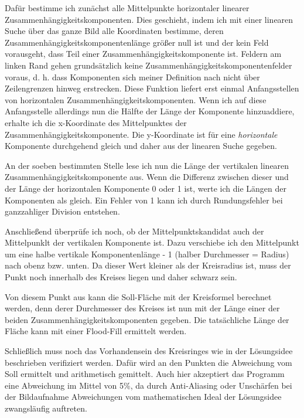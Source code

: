 Dafür bestimme ich zunächst alle Mittelpunkte horizontaler linearer Zusammenhängigkeitskomponenten. Dies geschieht, indem ich mit einer linearen Suche über das ganze Bild alle Koordinaten bestimme, deren Zusammenhängigkeitskomponentenlänge größer null ist und der kein Feld vorausgeht, dass Teil einer Zusammenhängigkeitskomponente ist. Feldern am linken Rand gehen grundsätzlich keine Zusammenhängigkeitskomponentenfelder voraus, d. h. dass Komponenten sich meiner Definition nach nicht über Zeilengrenzen hinweg erstrecken. Diese Funktion liefert erst einmal Anfangsstellen von horizontalen Zusammenhängigkeitskomponenten. Wenn ich auf diese Anfangsstelle allerdings nun die Hälfte der Länge der Komponente hinzuaddiere, erhalte ich die x-Koordinate des Mittelpunktes der Zusammenhängigkeitskomponente. Die y-Koordinate ist für eine \textit{horizontale} Komponente durchgehend gleich und daher aus der linearen Suche gegeben.

An der soeben bestimmten Stelle lese ich nun die Länge der vertikalen linearen Zusammenhängigkeitskomponente aus. Wenn die Differenz zwischen dieser und der Länge der horizontalen Komponente 0 oder 1 ist, werte ich die Längen der Komponenten als gleich. Ein Fehler von 1 kann ich durch Rundungsfehler bei ganzzahliger Division entstehen.

Anschließend überprüfe ich noch, ob der Mittelpunktskandidat auch der Mittelpunklt der vertikalen Komponente ist. Dazu verschiebe ich den Mittelpunkt um eine halbe vertikale Komponentenlänge - 1 (halber Durchmesser = Radius) nach obenz bzw. unten. Da dieser Wert kleiner als der Kreisradius ist, muss der Punkt noch innerhalb des Kreises liegen und daher schwarz sein. 

Von diesem Punkt aus kann die Soll-Fläche mit der Kreisformel berechnet werden, denn derer Durchmesser des Kreises ist nun mit der Länge einer der beiden Zusammenhängigkeitskomponenten gegeben. Die tatsächliche Länge der Fläche kann mit einer Flood-Fill ermittelt werden.

Schließlich muss noch das Vorhandensein des Kreisringes wie in der Lösungsidee beschrieben verifiziert werden. Dafür wird an den Punkten die Abweichung vom Soll ermittelt und arithmetisch gemittelt. Auch hier akzeptiert das Programm eine Abweichung im Mittel von 5\%, da durch Anti-Aliasing oder Unschärfen bei der Bildaufnahme Abweichungen vom mathematischen Ideal der Lösungsidee zwangsläufig auftreten.
\pagebreak
